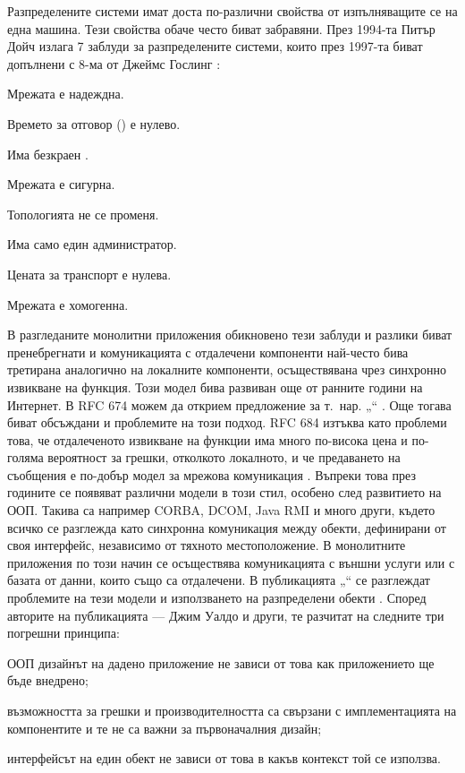 Разпределените системи имат доста по-различни свойства от изпълняващите се на една машина. Тези свойства обаче често биват забравяни. През 1994-та Питър Дойч излага 7 заблуди за разпределените системи, които през 1997-та биват допълнени с 8-ма от Джеймс Гослинг \cite{deustch1994FallaciesOfDistributedComputing}:

\begin{enumerate*}
  \item Мрежата е надеждна.
  \item Времето за отговор () е нулево.
  \item Има безкраен .
  \item Мрежата е сигурна.
  \item Топологията не се променя.
  \item Има само един администратор.
  \item Цената за транспорт е нулева.
  \item Мрежата е хомогенна.
\end{enumerate*}

В разгледаните монолитни приложения обикновено тези заблуди и разлики биват пренебрегнати и комуникацията с отдалечени компоненти най-често бива третирана аналогично на локалните компоненти, осъществявана чрез синхронно извикване на функция. Този модел бива развиван още от ранните години на Интернет. В RFC 674 можем да открием предложение за т.~нар. „“ \cite{rfc674}. Още тогава биват обсъждани и проблемите на този подход. RFC 684 изтъква като проблеми това, че отдалеченото извикване на функции има много по-висока цена и по-голяма вероятност за грешки, отколкото локалното, и че предаването на съобщения е по-добър модел за мрежова комуникация \cite{rfc684}. Въпреки това през годините се появяват различни модели в този стил, особено след развитието на ООП. Такива са например CORBA, DCOM, Java RMI и много други, където всичко се разглежда като синхронна комуникация между обекти, дефинирани от своя интерфейс, независимо от тяхното местоположение. В монолитните приложения по този начин се осъществява комуникацията с външни услуги или с базата от данни, които също са отдалечени. В публикацията „“ се разглеждат проблемите на тези модели и използването на разпределени обекти \cite{waldo1994ANoteOnDistributedProgramming}. Според авторите на публикацията — Джим Уалдо и други, те разчитат на следните три погрешни принципа:

\begin{itemize*}
  \item ООП дизайнът на дадено приложение не зависи от това как приложението ще бъде внедрено;
  \item възможността за грешки и производителността са свързани с имплементацията на компонентите и те не са важни за първоначалния дизайн;
  \item интерфейсът на един обект не зависи от това в какъв контекст той се използва.
\end{itemize*}

